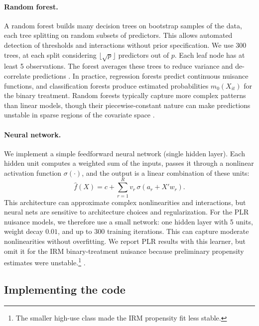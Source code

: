 \documentclass[11pt,oneside,a4paper]{book}
\begin{document}
\paragraph{Random forest.}
A random forest builds many decision trees on bootstrap samples of the data, each tree splitting on random subsets of predictors. This allows automated detection of thresholds and interactions without prior specification. We use 300 trees, at each split considering \(\lfloor\sqrt{p}\rfloor\) predictors out of \(p\). Each leaf node has at least 5 observations. The forest averages these trees to reduce variance and de-correlate predictions \citep{breiman2001randomforests}. In practice, regression forests predict continuous nuisance functions, and classification forests produce estimated probabilities \(m_0(X_{it})\) for the binary treatment. Random forests typically capture more complex patterns than linear models, though their piecewise-constant nature can make predictions unstable in sparse regions of the covariate space \citep{wright2017ranger}.

\paragraph{Neural network.}
We implement a simple feedforward neural network (single hidden layer). Each hidden unit computes a weighted sum of the inputs, passes it through a nonlinear activation function \(\sigma(\cdot)\), and the output is a linear combination of these units:
\begin{equation*}
\widehat{f}(X)
=
c+\sum_{r=1}^{R}v_r\,\sigma\!\left(a_r+X'w_r\right).
\end{equation*}
This architecture can approximate complex nonlinearities and interactions, but neural nets are sensitive to architecture choices and regularization. For the PLR nuisance models, we therefore use a small network: one hidden layer with 5 units, weight decay \(0.01\), and up to 300 training iterations. This can capture moderate nonlinearities without overfitting. We report PLR results with this learner, but omit it for the IRM binary-treatment nuisance because preliminary propensity estimates were unstable.\footnote{The smaller high-use class made the IRM propensity fit less stable.} \citep{hornik1989universal,venables2002mass,fuhr2024dml}.

\subsection[Implementing the Code]{Implementing the code}
\label{sec:estimation_workflow}
\end{document}
